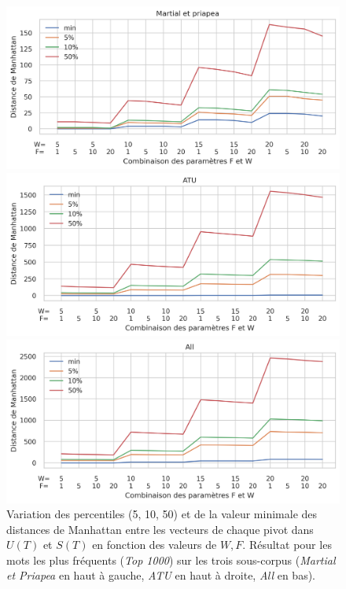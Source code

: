 \begin{figure}[ht]
    \centering
    \begin{minipage}{.49\linewidth}%
        \includegraphics[width=1\linewidth]{figures/chap1/part2/manhattan_martial.png} 
    \end{minipage}%
    \hfill
    \begin{minipage}{.49\linewidth}
        \includegraphics[width=1\linewidth]{figures/chap1/part2/manhattan_ATU.png}
    \end{minipage}
    \includegraphics[width=.8\linewidth]{figures/chap1/part2/manhattan_All.png}
    \caption{Variation des percentiles (5, 10, 50) et de la valeur minimale des distances de Manhattan entre les vecteurs de chaque pivot dans $U(T)$ et $S(T)$ en fonction des valeurs de $W,F$. Résultat pour les mots les plus fréquents (\textit{Top 1000}) sur les trois sous-corpus (\textit{Martial et Priapea} en haut à gauche, \textit{ATU} en haut à droite, \textit{All} en bas).}
    \label{fig:chap1:noise:manhattan}
\end{figure}

